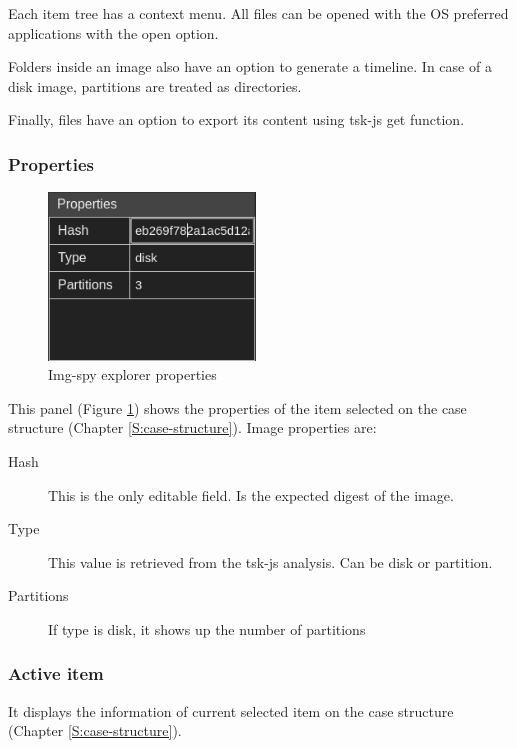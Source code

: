 Each item tree has a context menu. All files can be opened with the OS
preferred applications with the open option.

Folders inside an image also have an option to generate a timeline. In case of
a disk image, partitions are treated as directories.

Finally, files have an option to export its content using tsk-js get function.

\subsubsection{Properties}
\label{S:explorer-properties}

\begin{figure}
	\includegraphics[width=5.5cm]{./figures/explorer-properties.png}
	\centering
	\caption{Img-spy explorer properties}
	\label{F:img-spy-explorer-properties}
\end{figure}

This panel (Figure \ref{F:img-spy-explorer-properties}) shows the properties of
the item selected on the case structure (Chapter \ref{S:case-structure}).
Image properties are:

\begin{description}
	\item[Hash] This is the only editable field. Is the expected digest of the 
	image. 

	\item[Type] This value is retrieved from the tsk-js analysis. Can be disk
	or partition.
	
	\item[Partitions] If type is disk, it shows up the number of partitions
\end{description}

\subsubsection{Active item}

It displays the information of current selected item on the case structure
(Chapter \ref{S:case-structure}).

